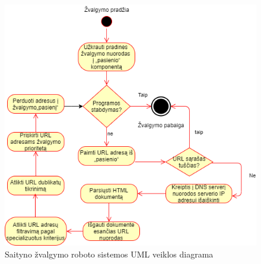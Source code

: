 \begin{figure}[ht!]
\centering
\includegraphics[scale=0.5]{img/Web_Crawler_Activity_Diagram.png}
\caption{Saityno žvalgymo roboto sistemos UML veiklos diagrama \cite{CategoriesOfWebCrawlersAndOverview}}
\label{fig:system_activity_diagram}
\end{figure}